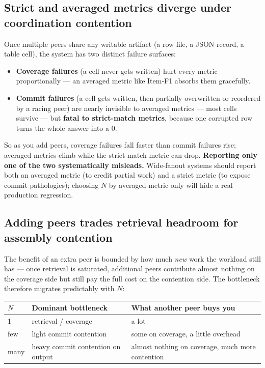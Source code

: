 \documentclass[11pt]{article}
\begin{document}
\subsection{Strict and averaged metrics diverge under coordination contention}

Once multiple peers share any writable artifact (a row file, a JSON record, a table cell), the system has two distinct failure surfaces:
\begin{itemize}[leftmargin=1.2em]
  \item \textbf{Coverage failures} (a cell never gets written) hurt every metric proportionally --- an averaged metric like Item-F1 absorbs them gracefully.
  \item \textbf{Commit failures} (a cell gets written, then partially overwritten or reordered by a racing peer) are nearly invisible to averaged metrics --- most cells survive --- but \textbf{fatal to strict-match metrics}, because one corrupted row turns the whole answer into a 0.
\end{itemize}
So as you add peers, coverage failures fall faster than commit failures rise; averaged metrics climb while the strict-match metric can drop. \textbf{Reporting only one of the two systematically misleads.} Wide-fanout systems should report both an averaged metric (to credit partial work) and a strict metric (to expose commit pathologies); choosing $N$ by averaged-metric-only will hide a real production regression.

\subsection{Adding peers trades retrieval headroom for assembly contention}

The benefit of an extra peer is bounded by how much \emph{new} work the workload still has --- once retrieval is saturated, additional peers contribute almost nothing on the coverage side but still pay the full cost on the contention side. The bottleneck therefore migrates predictably with $N$:

\begin{center}
\begin{tabular}{lll}
\toprule
$N$ & Dominant bottleneck & What another peer buys you \\
\midrule
1     & retrieval / coverage              & a lot \\
few   & light commit contention           & some on coverage, a little overhead \\
many  & heavy commit contention on output & almost nothing on coverage, much more contention \\
\bottomrule
\end{tabular}
\end{center}
\end{document}
